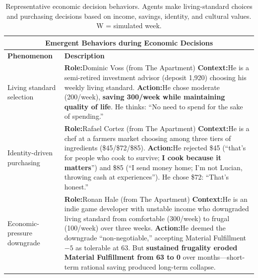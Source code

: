 \begin{table}[t]
\centering
\small
\caption{Representative economic decision behaviors. Agents make living-standard choices and purchasing decisions based on income, savings, identity, and cultural values. W = simulated week.}
\label{tab:economic}
\begin{tabular}{p{0.8in}p{4.3in}}
\toprule
\multicolumn{2}{c}{\textbf{Emergent Behaviors during Economic Decisions}} \\
\midrule
\textbf{Phenomenon} & \textbf{Description} \\
\midrule

Living \newline standard \newline selection
&
\textbf{Role:}\quad Dominic Voss \hfill (from The Apartment) \newline
\textbf{Context:}\quad He is a semi-retired investment advisor (deposit 1,920) choosing his weekly living standard. \newline
\textbf{Action:}\quad He chose moderate (200/week), \textbf{saving 300/week while maintaining quality of life}. He thinks: ``No need to spend for the sake of spending.''
\\
\midrule

Identity-\newline driven \newline purchasing
&
\textbf{Role:}\quad Rafael Cortez \hfill (from The Apartment) \newline
\textbf{Context:}\quad He is a chef at a farmers market choosing among three tiers of ingredients (\$45/\$72/\$85). \newline
\textbf{Action:}\quad He rejected \$45 (``that's for people who cook to survive; \textbf{I cook because it matters}'') and \$85 (``I send money home; I'm not Lucian, throwing cash at experiences''). He chose \$72: ``That's honest.''
\\
\midrule

Economic-\newline pressure \newline downgrade
&
\textbf{Role:}\quad Ronan Hale \hfill (from The Apartment) \newline
\textbf{Context:}\quad He is an indie game developer with unstable income who downgraded living standard from comfortable (300/week) to frugal (100/week) over three weeks. \newline
\textbf{Action:}\quad He deemed the downgrade ``non-negotiable,'' accepting Material Fulfillment $-5$ as tolerable at 63. But \textbf{sustained frugality eroded Material Fulfillment from 63 to 0} over months---short-term rational saving produced long-term collapse.
\\
\midrule


\end{tabular}
\end{table}
